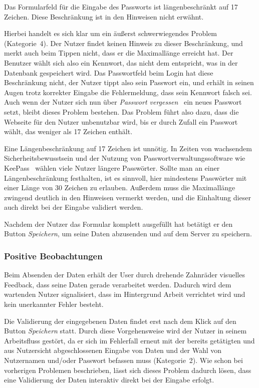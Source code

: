 {
Das Formularfeld für die Eingabe des Passworts ist längenbeschränkt auf 17 Zeichen. Diese Beschränkung ist in den Hinweisen nicht erwähnt.
}
{

Hierbei handelt es sich klar um ein äußerst schwerwiegendes Problem (Kategorie~4). Der Nutzer findet keinen Hinweis zu dieser Beschränkung, und merkt auch beim Tippen nicht, dass er die Maximallänge erreicht hat. Der Benutzer wählt sich also ein Kennwort, das nicht dem entspricht, was in der Datenbank gespeichert wird. Das Passwortfeld beim Login hat diese Beschränkung nicht, der Nutzer tippt also sein Passwort ein, und erhält in seinen Augen trotz korrekter Eingabe die Fehlermeldung, dass sein Kennwort falsch sei. Auch wenn der Nutzer sich nun über \emph{Passwort vergessen} ~ein neues Passwort setzt, bleibt dieses Problem bestehen. Das Problem führt also dazu, dass die Webseite für den Nutzer unbenutzbar wird, bis er durch Zufall ein Passwort wählt, das weniger als 17 Zeichen enthält.
}
{
Eine Längenbeschränkung auf 17 Zeichen ist unnötig. In Zeiten von wachsendem Sicherheitsbewusstsein und der Nutzung von Passwortverwaltungssoftware wie \glqq KeePass\grqq ~ wählen viele Nutzer längere Passwörter. Sollte man an einer Längenbeschränkung festhalten, ist es sinnvoll, hier mindestens Passwörter mit einer Länge von 30 Zeichen zu erlauben. Außerdem muss die Maximallänge zwingend deutlich in den Hinweisen vermerkt werden, und die Einhaltung dieser auch direkt bei der Eingabe validiert werden.
}
\label{prob:frei:passwortlaenge}

Nachdem der Nutzer das Formular komplett ausgefüllt hat betätigt er den Button \emph{Speichern}, um seine Daten abzusenden und auf dem Server zu speichern.

\subsubsection*{Positive Beobachtungen}
\label{subsubsec:freischaltung_absenden_positiv}
Beim Absenden der Daten erhält der User durch drehende Zahnräder visuelles Feedback, dass seine Daten gerade verarbeitet werden. Dadurch wird dem wartenden Nutzer signalisiert, dass im Hintergrund Arbeit verrichtet wird und kein unerkannter Fehler besteht.

{
Die Validierung der eingegebenen Daten findet erst nach dem Klick auf den Button \emph{Speichern} statt.
}
{
Durch diese Vorgehensweise wird der Nutzer in seinem Arbeitsfluss gestört, da er sich im Fehlerfall erneut mit der bereits getätigten und aus Nutzersicht abgeschlossenen Eingabe von Daten und der Wahl von Nutzernamen und/oder Passwort befassen muss (Kategorie~2).
}
{
Wie schon bei vorherigen Problemen beschrieben, lässt sich dieses Problem dadurch lösen, dass eine Validierung der Daten interaktiv direkt bei der Eingabe erfolgt.
}
\label{prob:frei:validierung}

